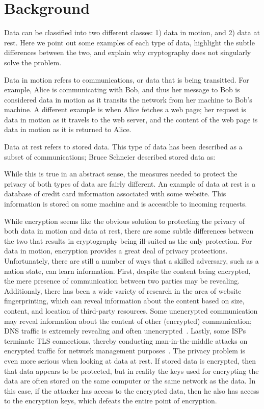 \section{Background}
\label{sec:background}

Data can be classified into two different classes: 1) data in motion, and 2) data at rest.  Here we point out some examples of each type of data, highlight the subtle differences between the two, and explain why cryptography does not singularly solve the problem.

Data in motion refers to communications, or data that is being transitted.  For example, Alice is communicating with Bob, and thus her message to Bob is considered data in motion as it transits the network from her machine to Bob's machine.  A different example is when Alice fetches a web page; her request is data in motion as it travels to the web server, and the content of the web page is data in motion as it is returned to Alice.

Data at rest refers to stored data. This type of data has been described as a subset of communications; Bruce Schneier described stored data as: 


While this is true in an abstract sense, the measures needed to protect the privacy of both types of data are fairly different.  An example of data at rest is a database of credit card information associated with some website.  This information is stored on some machine and is accessible to incoming requests.  

While encryption seems like the obvious solution to protecting the privacy of both data in motion and data at rest, there are some subtle differences between the two that results in cryptography being ill-suited as the only protection.  For data in motion, encryption provides a great deal of privacy protections.  Unfortunately, there are still a number of ways that a skilled adversary, such as a nation state, can learn information.  First, despite the content being encrypted, the mere presence of communication between two parties may be revealing.  Additionaly, there has been a wide variety of research in the area of website fingerprinting, which can reveal information about the content based on size, content, and location of third-party resources.  Some unencrypted communication may reveal information about the content of other (encrypted) communication; DNS traffic is extremely revealing and often unencrypted~\cite{isps_see}.  Lastly, some ISPs terminate TLS connections, thereby conducting man-in-the-middle attacks on encrypted traffic for network management purposes~\cite{gogo}.  The privacy problem is even more serious when looking at data at rest.  If stored data is encrypted, then that data appears to be protected, but in reality the keys used for encrypting the data are often stored on the same computer or the same network as the data.  In this case, if the attacker has access to the encrypted data, then he also has access to the encryption keys, which defeats the entire point of encryption.  

